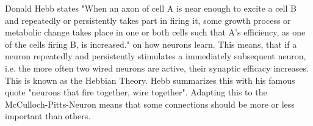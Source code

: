 
Donald Hebb states "When an axon of cell A is near enough to excite a cell B and repeatedly or persistently takes part in firing it, some growth process or metabolic change takes place in one or both cells such that A's efficiency, as one of the cells firing B, is increased." \cite{Hebb1949} on how neurons learn.
This means, that if a neuron repeatedly and persistently stimulates a immediately subsequent neuron, i.e. the more often two wired neurons are active, their synaptic efficacy increases.
This is known as the Hebbian Theory.
Hebb summarizes this with his famous quote "neurons that fire together, wire together".
Adapting this to the McCulloch-Pitts-Neuron means that some connections should be more or less important than others.

